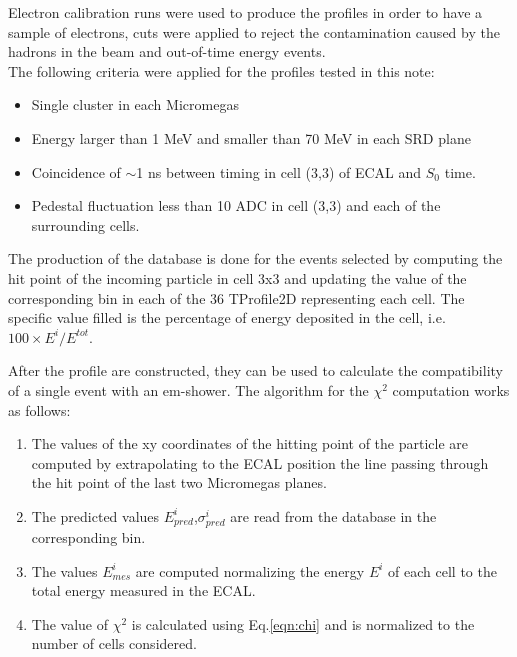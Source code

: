 Electron calibration runs were used to produce the profiles in order to have a sample of electrons, cuts were applied to reject the contamination caused by the hadrons in the beam and out-of-time energy events. \\
The following criteria were applied for the profiles tested in this note:

\begin{itemize}
\item Single cluster in each Micromegas
\item Energy larger than 1 MeV and smaller than 70 MeV in each SRD
  plane
\item Coincidence of $\sim$1 ns between timing in cell (3,3) of ECAL
  and $S_0$ time.
\item Pedestal fluctuation less than 10 ADC in cell (3,3) and each of
  the surrounding cells.
\end{itemize}

The production of the database is done for the events selected by computing the hit point of the incoming particle in cell
3x3 and updating the value of the corresponding bin in each of the 36
TProfile2D representing each cell. The specific value filled is the
percentage of energy deposited in the cell, i.e. $100 \times E^i/E^{tot}$.

After the profile are constructed, they can be used to calculate the compatibility of a single event with an em-shower. The algorithm for the $\chi^2$ computation works as follows:
\begin{enumerate}
\item The values of the xy coordinates of the hitting point of the
  particle are computed by extrapolating to the ECAL position the line
  passing through the hit point of the last two Micromegas planes.
\item The predicted values $E_{pred}^i$,$\sigma^{i}_{pred}$ are read from the database in the corresponding bin.
\item The values $E_{mes}^i$ are computed normalizing the energy $E^i$ of each cell to the total energy measured in the ECAL.
\item The value of $\chi^2$ is calculated using Eq.\ref{eqn:chi} and is normalized to the number of cells considered.
\end{enumerate}

